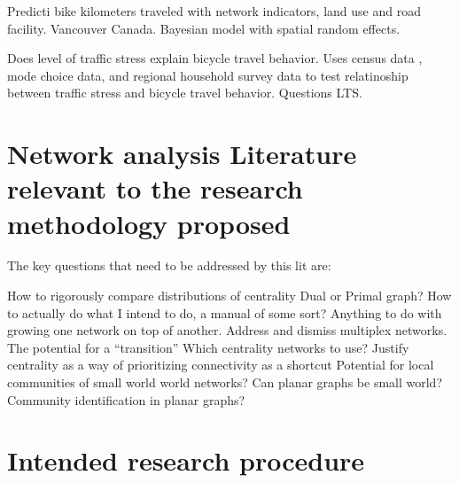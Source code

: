 \documentclass[11pt]{article} %
\begin{document}

Predicti bike kilometers traveled with network indicators, land use and road facility. Vancouver Canada. Bayesian model with spatial random effects. 
\cite{osama2017models}


Does level of traffic stress explain bicycle travel behavior. Uses census data , mode choice data, and regional household survey data to test relatinoship between traffic stress and bicycle travel behavior. Questions LTS. 
\cite{wang2016does}








\section{Network analysis Literature relevant to the research methodology proposed}

The key questions that need to be addressed by this lit are: 

How to rigorously compare distributions of centrality
Dual or Primal graph? 
How to actually do what I intend to do, a manual of some sort?
Anything to do with growing one network on top of another. 
Address and dismiss multiplex  networks. 
The potential for a ``transition''
Which centrality networks to use?
Justify centrality as a way of prioritizing connectivity as a shortcut
Potential for local communities of small world world networks? 
Can planar graphs be small world?
Community identification in planar graphs? 


\cite{}

\cite{}










\section{Intended research procedure}





\end{document}
